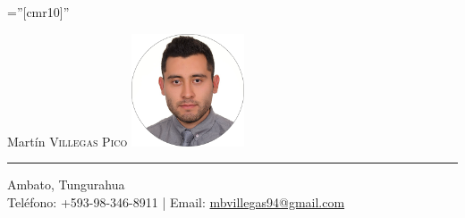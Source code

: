 \documentclass[a4paper,10.9pt]{article}
\begin{document}
  




\font\fb=''[cmr10]'' %


{ \Huge Martín \textsc{Villegas Pico}}\hfill
\includegraphics[width=9em]{img/martin.png} \\
\textcolor{black!30}{\rule[.1\baselineskip]{\textwidth}{1pt}}

\begin{center}
Ambato, Tungurahua\\
Teléfono: +593-98-346-8911 | Email: \href{mailto:mbvillegas94@gmail.com}{mbvillegas94@gmail.com}
\end{center}


%
\end{document}

